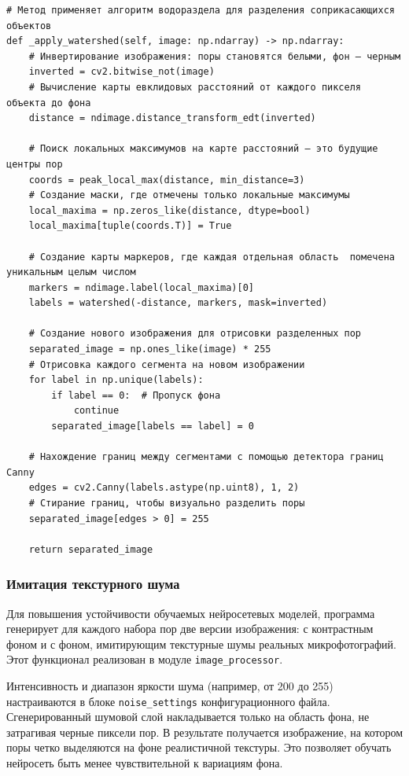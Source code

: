 \documentclass[code]{wordcore}
\begin{document}
\begin{code}
	\begin{verbatim}
# Метод применяет алгоритм водораздела для разделения соприкасающихся объектов
def _apply_watershed(self, image: np.ndarray) -> np.ndarray:
    # Инвертирование изображения: поры становятся белыми, фон — черным
    inverted = cv2.bitwise_not(image)
    # Вычисление карты евклидовых расстояний от каждого пикселя объекта до фона
    distance = ndimage.distance_transform_edt(inverted)
    
    # Поиск локальных максимумов на карте расстояний — это будущие центры пор 
    coords = peak_local_max(distance, min_distance=3)
    # Создание маски, где отмечены только локальные максимумы
    local_maxima = np.zeros_like(distance, dtype=bool)
    local_maxima[tuple(coords.T)] = True
    
    # Создание карты маркеров, где каждая отдельная область  помечена уникальным целым числом
    markers = ndimage.label(local_maxima)[0]
    labels = watershed(-distance, markers, mask=inverted)
    
    # Создание нового изображения для отрисовки разделенных пор
    separated_image = np.ones_like(image) * 255
    # Отрисовка каждого сегмента на новом изображении
    for label in np.unique(labels):
        if label == 0:  # Пропуск фона
            continue
        separated_image[labels == label] = 0
        
    # Нахождение границ между сегментами с помощью детектора границ Canny
    edges = cv2.Canny(labels.astype(np.uint8), 1, 2)
    # Стирание границ, чтобы визуально разделить поры
    separated_image[edges > 0] = 255
    
    return separated_image
\end{verbatim}
\end{code}

\subsubsection{Имитация текстурного шума}

Для повышения устойчивости обучаемых нейросетевых моделей, программа генерирует для каждого набора пор две версии изображения: с контрастным фоном и с фоном, имитирующим текстурные шумы реальных микрофотографий. Этот функционал реализован в модуле \texttt{image\_processor}.

Интенсивность и диапазон яркости шума (например, от 200 до 255) настраиваются в блоке \texttt{noise\_settings} конфигурационного файла. Сгенерированный шумовой слой накладывается только на область фона, не затрагивая черные пиксели пор. В результате получается изображение, на котором поры четко выделяются на фоне реалистичной текстуры. Это позволяет обучать нейросеть быть менее чувствительной к вариациям фона.
\end{document}
